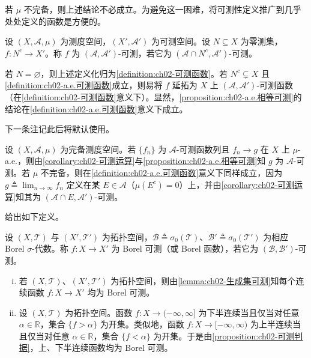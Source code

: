 \documentclass[../../main.tex]{subfiles}%
\begin{document}
若 $\mu$ 不完备，则上述结论不必成立。为避免这一困难，将可测性定义推广到几乎处处定义的函数是方便的。

\begin{definition}\label{definition:ch02-a.e.可测函数}\label{definition:ch02-几乎处处可测}
设 $(X,\mathscr A,\mu)$ 为测度空间，$(X',\mathscr A')$ 为可测空间。设 $N\subseteq X$ 为零测集，$f:N^c\to X'$。称 $f$ 为 $(\mathscr A,\mathscr A')$-可测，若它为 $(\mathscr A\cap N^c,\mathscr A')$-可测。
\end{definition}

若 $N=\varnothing $，则上述定义化归为\cref{definition:ch02-可测函数}。若 $N^c\subsetneq X$ 且\cref{definition:ch02-a.e.可测函数}成立，则易将 $f$ 延拓为 $X$ 上 $(\mathscr A,\mathscr A')$-可测函数（在\cref{definition:ch02-可测函数}意义下）。显然，\cref{proposition:ch02-a.e.相等可测}的结论在\cref{definition:ch02-a.e.可测函数}意义下成立。

下一条注记此后将默认使用。

\begin{remark}\label{remark:ch02-a.e.极限可测}
\label{remark:ch02-几乎处处}
设 $(X,\mathscr A,\mu)$ 为完备测度空间。若 $\{f_n\}$ 为 $\mathscr A$-可测函数列且 $f_n\to g$ 在 $X$ 上 $\mu$-a.e.，则由\cref{corollary:ch02-可测运算}与\cref{proposition:ch02-a.e.相等可测}知 $g$ 为 $\mathscr A$-可测。若 $\mu$ 不完备，则在\cref{definition:ch02-a.e.可测函数}意义下同样成立，因为 $g\triangleq \lim_{n\to\infty}f_n$ 定义在某 $E\in\mathscr A$（$\mu(E^c)=0$）上，并由\cref{corollary:ch02-可测运算}知其为 $(\mathscr A\cap E,\mathscr A')$-可测。
\end{remark}

给出如下定义。

\begin{definition}\label{definition:ch02-Borel函数}
设 $(X,\mathscr T)$ 与 $(X',\mathscr T')$ 为拓扑空间，$\mathscr B\triangleq \sigma_0(\mathscr T)$、$\mathscr B'\triangleq \sigma_0(\mathscr T')$ 为相应 Borel $\sigma$-代数。称 $f:X\to X'$ 为 Borel 可测（或 Borel 函数），若它为 $(\mathscr B,\mathscr B')$-可测。
\end{definition}

\begin{remark}\label{remark:ch02-连续半连续Borel}\label{remark:ch02-连续Borel}
\label{remark:ch02-连续逼近注}
\begin{enumerate}[(i)]
\item 若 $(X,\mathscr T)$、$(X',\mathscr T')$ 为拓扑空间，则由\cref{lemma:ch02-生成集可测}知每个连续函数 $f:X\to X'$ 均为 Borel 可测。
\item 设 $(X,\mathscr T)$ 为拓扑空间。函数 $f:X\to(-\infty,\infty]$ 为下半连续当且仅当对任意 $\alpha\in\mathbb R$，集合 $\{f>\alpha\}$ 为开集。类似地，函数 $f:X\to[-\infty,\infty)$ 为上半连续当且仅当对任意 $\alpha\in\mathbb R$，集合 $\{f<\alpha\}$ 为开集。于是由\cref{proposition:ch02-可测判据}，上、下半连续函数均为 Borel 可测。
\end{enumerate}
\end{remark}
\end{document}
